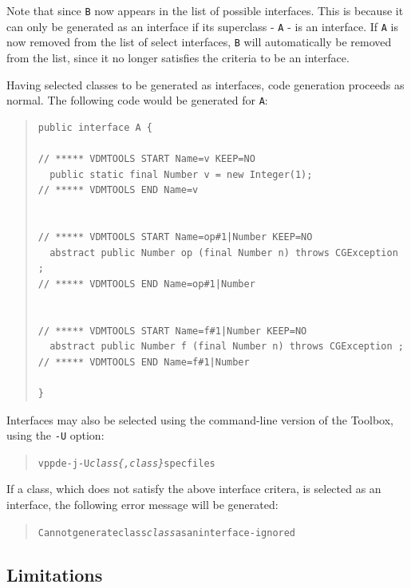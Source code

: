 \documentclass[\pformat,11pt]{article}
\begin{document}
Note that since \texttt{B} now appears in the list of possible
interfaces. This is because it can only be generated as an interface
if its superclass - \texttt{A} - is an interface. If \texttt{A} is now
removed from the list of select interfaces, \texttt{B} will
automatically be removed from the list, since it no longer satisfies
the criteria to be an interface.

Having selected classes to be generated as interfaces, code generation
proceeds as normal. The following code would be generated for
\texttt{A}:
\begin{quote}
\begin{verbatim}
public interface A {
 
// ***** VDMTOOLS START Name=v KEEP=NO
  public static final Number v = new Integer(1);
// ***** VDMTOOLS END Name=v


// ***** VDMTOOLS START Name=op#1|Number KEEP=NO
  abstract public Number op (final Number n) throws CGException ;
// ***** VDMTOOLS END Name=op#1|Number


// ***** VDMTOOLS START Name=f#1|Number KEEP=NO
  abstract public Number f (final Number n) throws CGException ;
// ***** VDMTOOLS END Name=f#1|Number

} 
\end{verbatim}
\end{quote}

Interfaces may also be selected using the command-line version of the
Toolbox, using the \texttt{-U} option:
\begin{quote}
\begin{alltt}
vppde -j -U \textit{class\{,class\}} specfiles
\end{alltt}
\end{quote}
If a class, which does not satisfy the above interface critera, is
selected as an interface, the following error message will be
generated:
\begin{quote}
\begin{alltt}
Can not generate class \textit{class} as an interface - ignored
\end{alltt}
\end{quote}



\subsection{Limitations}\label{sec:unsupported}
\end{document}
